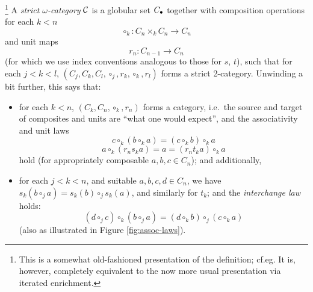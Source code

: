 \begin{definition}\footnote{This is a somewhat old-fashioned presentation of the definition; cf.\@ eg.\@ \cite{street:algebra-of-oriented-simplexes}  It is, however, completely equivalent to the now more usual presentation via iterated enrichment.}
A \emph{strict $\omega$-category} $\mathcal{C}$ is a globular set $C_\bullet$ together with composition operations for each $k < n$
\[\circ_k \colon C_n \times_k C_n \to C_n\]
and unit maps
\[r_n \colon C_{n-1} \to C_n\]
(for which we use index conventions analogous to those for $s$, $t$),
 such that for each $j < k < l$, $(C_j,C_k,C_l, \circ_j, r_k, \circ_k, r_l)$ forms a strict 2-category.  Unwinding a bit further, this says that:
\begin{itemize}
\item for each $k < n$, $(C_k,C_n, \circ_k, r_n)$ forms a category, i.e.\ the source and target of composites and units are ``what one would expect'', and the associativity and unit laws
\[ c \circ_k (b \circ_k a) = (c \circ_k b) \circ_k a\]
\[ a \circ_k (r_n s_k a) = a = (r_n t_k a) \circ_k a\]
hold (for appropriately composable $a, b, c \in C_n$); and additionally,
\item for each $j < k < n$, and suitable $a,b,c,d \in C_n$, we have $s_k(b \circ_j a) = s_k(b) \circ_j s_k(a)$, and similarly for $t_k$; and the \emph{interchange law} holds:
\[ (d \circ_j c) \circ_k (b \circ_j a) = (d \circ_k b) \circ_j (c \circ_k a)\]
(also as illustrated in Figure \ref{fig:assoc-laws}). 
\end{itemize}
\end{definition}

